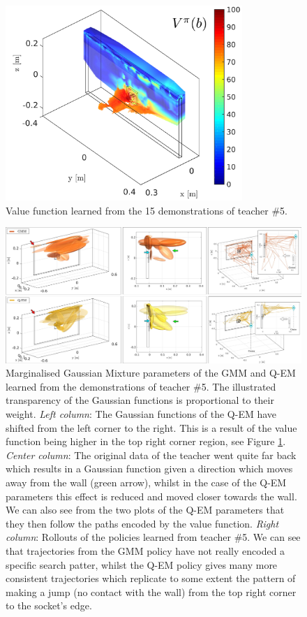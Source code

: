 \begin{figure}
 \centering
 \includegraphics[width=0.8\textwidth]{./ch4-PiH/Figures/Fig/value_subj_5.pdf}
 \caption{Value function learned from the 15 demonstrations of teacher \#5.}
 \label{fig:value_function_subj_5}
\end{figure}
 
 \begin{figure}
    \centering
    \includegraphics[width=\textwidth]{./ch4-PiH/Figures/Fig/gmm.pdf}
    \caption{Marginalised Gaussian Mixture parameters of the GMM and Q-EM learned from the demonstrations of teacher \#5. 
    The illustrated transparency of the Gaussian functions is proportional to their weight.
    \textit{Left column}: The Gaussian functions of the Q-EM have shifted from the left corner to the right. This is a result of the value function 
    being higher in the top right corner region, see Figure \ref{fig:value_function_subj_5}. \textit{Center column}:  The original data of the teacher 
    went quite far back which results in a Gaussian function given a direction which moves away from the wall (green arrow), whilst in the case
    of the Q-EM parameters this effect is reduced and moved closer towards the wall.  We can also see from the two plots of the Q-EM parameters 
    that they then follow the paths encoded by the value function.    
    \textit{Right column}: Rollouts of the policies learned from teacher \#5. We can see that trajectories from the GMM policy have not really 
    encoded a specific search patter, whilst the Q-EM policy gives many more consistent trajectories which replicate to some extent 
    the pattern of making a jump (no contact with the wall) from the top right corner to the socket's edge.}
    \label{fig:gmm_exp4}
\end{figure}
 
